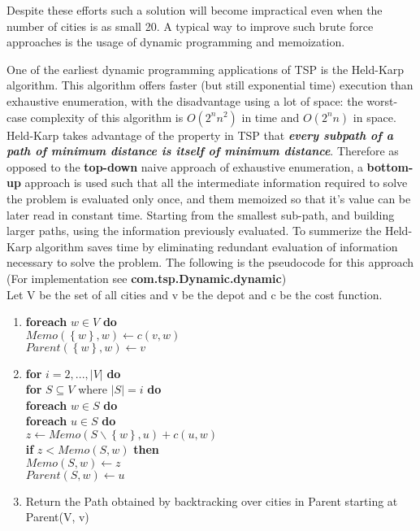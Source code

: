 \documentclass[11pt]{article}
\begin{document}
 Despite these efforts such a solution will become impractical even when the number of cities is as small 20. A typical way to improve such brute force approaches is the usage of dynamic programming and memoization. \par
 One of the earliest dynamic programming applications of TSP is the Held-Karp algorithm. This algorithm offers faster (but still exponential time) execution than exhaustive enumeration, with the disadvantage using a lot of space: the worst-case complexity of this algorithm is $O(2^n n^2)$ in time and $O(2^n n)$ in space. Held-Karp takes advantage of the property in TSP that \textbf{\textit{every subpath of a path of minimum distance is itself of minimum distance}}. Therefore as opposed to the \textbf{top-down} naive approach of exhaustive enumeration, a \textbf{bottom-up} approach is used such that all the intermediate information required to solve the problem is evaluated only once, and them memoized so that it's value can be later read in constant time. Starting from the smallest sub-path, and building larger paths, using the information previously evaluated. To summerize the Held-Karp algorithm saves time by eliminating redundant evaluation of information necessary to solve the problem. The following is the pseudocode for this approach (For implementation see \textbf{com.tsp.Dynamic.dynamic}) \\
Let V be the set of all cities and v be the depot and c be the cost function.
\begin{enumerate}
\item  \textbf{foreach} $w \in V$ \textbf{do} \\
\hspace*{5mm} $Memo(\left \{ w \right \}, w) \leftarrow c(v, w)$ \\
\hspace*{5mm} $Parent(\left \{ w \right \}, w) \leftarrow v$ 
\item \textbf{for} $i = 2, ..., \left | V  \right |$ \textbf{do} \\
\hspace*{5mm} \textbf{for} $S \subseteq V$ where $\left | S  \right |=i$ \textbf{do} \\
\hspace*{10mm} \textbf{foreach} $w \in S$ \textbf{do} \\
\hspace*{15mm} \textbf{foreach} $u \in S$ \textbf{do} \\
\hspace*{20mm} $z \leftarrow Memo(S \backslash \left \{ w \right \}, u) + c(u, w)$ \\
\hspace*{20mm} \textbf{if} $z < Memo(S, w)$ \textbf{then} \\
\hspace*{25mm} $Memo(S, w) \leftarrow z$ \\
\hspace*{25mm} $Parent(S, w) \leftarrow u$ \\
\item Return the Path obtained by backtracking over cities in Parent starting at Parent(V, v)
\end{enumerate}
\end{document}
